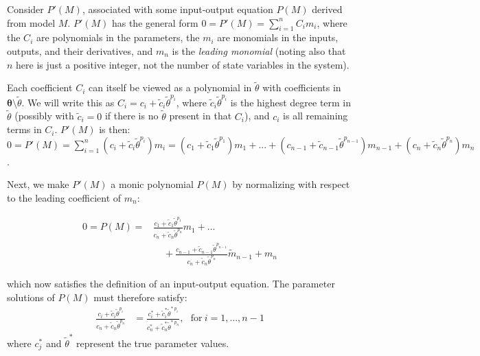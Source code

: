 \documentclass[a4paper,fleqn]{cas-dc}
\theoremstyle{definition}
\begin{document}
\begin{pf}
    Consider $P'(M)$, associated with some input-output equation $P(M)$ derived from model $M$. 
    $P'(M)$ has the general form $0 = P'(M) = \sum_{i = 1}^n C_i m_i$, where the $C_i$ are polynomials in the parameters, the $m_i$ are monomials in the inputs, outputs, and their derivatives, and $m_n$ is the \textit{leading monomial} (noting also that $n$ here is just a positive integer, not the number of state variables in the system).
    
    Each coefficient $C_i$ can itself be viewed as a polynomial in $\tilde{\theta}$ with coefficients in $\pmb{\theta}\setminus\tilde{\theta}$. We will write this as $C_i = c_i + \tilde{c}_i \tilde{\theta}^{p_i}$, where  $\tilde{c}_i \tilde{\theta}^{p_i}$ is the highest degree term in $\tilde{\theta}$ (possibly with $\tilde{c}_i=0$ if there is no $\tilde{\theta}$ present in that $C_i$), and $c_i$ is all remaining terms in $C_i$. $P'(M)$ is then: $0 = P'(M) = \sum_{i = 1}^n (c_i + \tilde{c}_i \tilde{\theta}^{p_i}) m_i = (c_1 + \tilde{c}_1 \tilde{\theta}^{p_1}) m_1 + ... + (c_{n-1} + \tilde{c}_{n-1} \tilde{\theta}^{p_{n-1}}) m_{n-1} + (c_{n} + \tilde{c}_{n} \tilde{\theta}^{p_{n}}) m_{n}$.

    Next, we make $P'(M)$ a monic polynomial $P(M)$ by normalizing with respect to the leading coefficient of $m_n$:
    \begin{fleqn}
    \begin{align*}
        0 = P(M) = &\frac{c_1 + \tilde{c}_1 \tilde{\theta}^{p_1}}{c_{n} + \tilde{c}_{n} \tilde{\theta}^{p_{n}}} m_1 + ... \\&~~~~~+ \frac{c_{n-1} + \tilde{c}_{n-1} \tilde{\theta}^{p_{n-1}}}{c_{n} + \tilde{c}_{n} \tilde{\theta}^{p_{n}}} \tilde{m}_{n-1} + m_n
    \end{align*}
    \end{fleqn}
    which now satisfies the definition of an input-output equation. The parameter solutions of $P(M)$ must therefore satisfy:
    \begin{align}
        \frac{c_i + \tilde{c}_i \tilde{\theta}^{p_i}}{c_n + \tilde{c}_n \tilde{\theta}^{p_n}} & = \frac{c^*_i + \tilde{c}_i^* \tilde{\theta}^{*~p_i}}{c_n^* + \tilde{c}_n^* \tilde{\theta}^{*~p_n}}, ~~~\text{for}~i=1,...,n-1 \label{psoln_thm1}
    \end{align}
    where $c_j^*$ and $\tilde{\theta}^*$ represent the true parameter values.
    

\end{pf}
\end{document}
